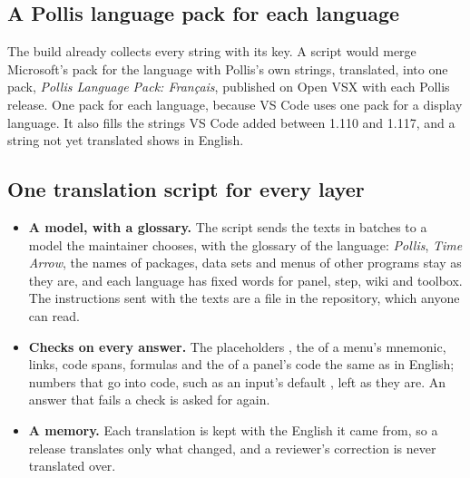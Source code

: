 \subsection{A Pollis language pack for each language}
The build already collects every  string with its key. A script would merge Microsoft's pack for the
language with Pollis's own strings, translated, into one pack, \emph{Pollis Language Pack: Français}, published on
Open VSX with each Pollis release. One pack for each language, because VS Code uses one pack for a display language.
It also fills the strings VS Code added between 1.110 and 1.117, and a string not yet translated shows in English.

\subsection{One translation script for every layer}
\begin{itemize}
  \item \textbf{A model, with a glossary.} The script sends the texts in batches to a model the maintainer chooses,
    with the glossary of the language: \emph{Pollis}, \emph{Time Arrow}, the names of packages, data sets and menus of
    other programs stay as they are, and each language has fixed words for panel, step, wiki and toolbox. The
    instructions sent with the texts are a file in the repository, which anyone can read.
  \item \textbf{Checks on every answer.} The placeholders , the \code{\&\&} of a menu's mnemonic, links,
    code spans, formulas and the  of a panel's code the same as in English; numbers that go into
    code, such as an input's default , left as they are. An answer that fails a check is asked for again.
  \item \textbf{A memory.} Each translation is kept with the English it came from, so a release translates only what
    changed, and a reviewer's correction is never translated over.
\end{itemize}

